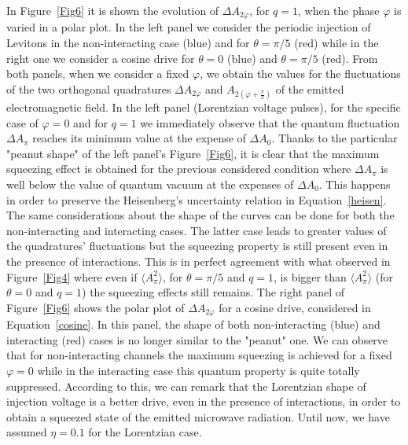 \documentclass[12pt]{iopart}
\begin{document}
In Figure~\ref{Fig6} it is shown the evolution of $\Delta A_{2\varphi}$, for $q=1$, when the phase $\varphi$ is varied in a polar plot. In the left panel we consider the periodic injection of Levitons in the non-interacting case (blue) and for $\theta=\pi/5$ (red) while in the right one we consider a cosine drive for $\theta=0$ (blue) and $\theta=\pi/5$ (red). From both panels, when we consider a fixed $\varphi$, we obtain the values for the fluctuations of the two orthogonal quadratures $\Delta A_{2\varphi}$ and $A_{2(\varphi+\frac{\pi}{2})}$ of the emitted electromagnetic field. In the left panel (Lorentzian voltage pulses), for the specific case of $\varphi=0$ and for $q=1$ we immediately observe that the quantum fluctuation $\Delta A_{\pi}$ reaches its minimum value at the expense of $\Delta A_0$. Thanks to the particular "peanut shape" of the left panel's Figure~\ref{Fig6}, it is clear that the maximum squeezing effect is obtained for the previous considered condition where $\Delta A_{\pi} $ is well below the value of quantum vacuum at the expenses of $\Delta A_0 $. This happens in order to preserve the Heisenberg's uncertainty relation in Equation~\eqref{heisen}. The same considerations about the shape of the curves can be done for both the non-interacting and interacting cases. The latter case leads to greater values of the quadratures' fluctuations but the squeezing property is still present even in the presence of interactions. This is in perfect agreement with what observed in Figure~\ref{Fig4} where even if $\langle A^2_\pi \rangle$, for $\theta=\pi/5$ and $q=1$, is bigger than $\langle A^2_\pi \rangle$ (for $\theta=0$ and $q=1$) the squeezing effects still remains. The right panel of Figure~\ref{Fig6} shows the polar plot of $\Delta A_{2\varphi} $ for a cosine drive, considered in Equation~\eqref{cosine}. In this panel, the shape of both non-interacting (blue) and interacting (red) cases is no longer similar to the "peanut" one. We can observe that for non-interacting channels the maximum squeezing is achieved for a fixed $\varphi=0$ while in the interacting case this quantum property is quite totally suppressed. According to this, we can remark that the Lorentzian shape of injection voltage is a better drive, even in the presence of interactions, in order to obtain a squeezed state of the emitted microwave radiation. Until now, we have assumed $\eta=0.1$ for the Lorentzian case.\\
\end{document}

